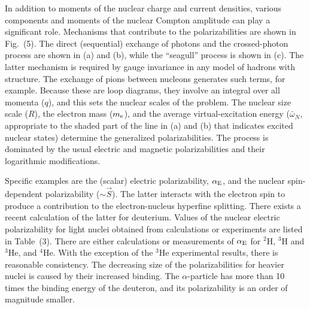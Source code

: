 \documentclass{svmult}
\begin{document}
In addition to moments of the nuclear charge and current densities, various
components and moments of the nuclear Compton
amplitude can play a significant role.
Mechanisms that contribute to the polarizabilities are shown in Fig.~(5). The
direct (sequential) exchange of photons and the crossed-photon process are shown
in (a) and (b), while the ``seagull'' process is shown in (c). The latter
mechanism is required by gauge invariance in any model of hadrons with
structure. The exchange of pions between nucleons generates such terms, for
example\cite{c-mec}. Because
these are loop diagrams, they involve an integral over all momenta ($q$), and
this sets the nuclear scales of the problem. The nuclear size 
scale ($R$), the electron mass ($m_{\rm e}$), and the
average virtual-excitation energy ($\bar{\omega}_N$, appropriate to the shaded
part of the line in (a) and (b) that indicates excited nuclear states) determine
the generalized polarizabilities\cite{ho-pol}.
The process is dominated by the usual electric 
and magnetic polarizabilities and their
logarithmic
modifications\cite{d-pol}.

Specific examples are the (scalar) electric polarizability, $\alpha_{\rm E}$,
and the nuclear spin-dependent
polarizability ($\sim \vec{S}$). The latter
interacts with the electron spin to produce a contribution to the
electron-nucleus hyperfine
splitting.  There
exists a recent calculation of the latter for
deuterium\cite{d-nu}. Values of the nuclear
electric polarizability for light
nuclei obtained from calculations or
experiments are listed in Table~(3). There are either calculations or
measurements of $\alpha_{\rm E}$ for $^2$H\cite{d-pol,d-pol-g,d-pol-x},
$^3$H\cite{3pol} and $^3$He\cite{3pol,4pol,he3-pol,rinker}, and
$^4$He\cite{He4-x,He4-t}. With the exception
of the $^3$He experimental results, there is reasonable consistency. The
decreasing size of the polarizabilities for heavier nuclei is caused by their
increased binding. The $\alpha$-particle has more than 10 times the binding
energy of the deuteron, and its polarizability is an order of magnitude smaller.
\end{document}
